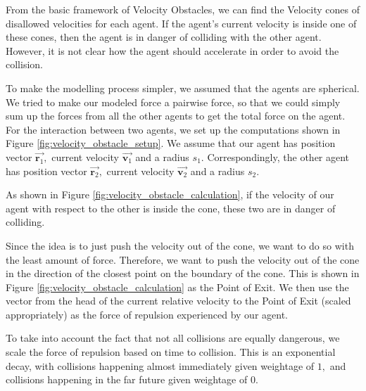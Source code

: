 \documentclass[a4paper,12pt]{article}
\begin{document}
From the basic framework of Velocity Obstacles, we can find the Velocity cones of disallowed velocities for each agent. If the agent's current velocity is inside one of these cones, then the agent is in danger of colliding with the other agent. However, it is not clear how the agent should accelerate in order to avoid the collision.

To make the modelling process simpler, we assumed that the agents are spherical. We tried to make our modeled force a pairwise force, so that we could simply sum up the forces from all the other agents to get the total force on the agent. For the interaction between two agents, we set up the computations shown in Figure \ref{fig:velocity_obstacle_setup}. We assume that our agent has position vector $\overrightarrow{\mathbf{r}_1},$ current velocity $\overrightarrow{\mathbf{v}_1}$ and a radius $s_1.$ Correspondingly, the other agent has position vector $\overrightarrow{\mathbf{r}_2},$ current velocity $\overrightarrow{\mathbf{v}_2}$ and a radius $s_2.$


As shown in Figure \ref{fig:velocity_obstacle_calculation}, if the velocity of our agent with respect to the other is inside the cone, these two are in danger of colliding. 

Since the idea is to just push the velocity out of the cone, we want to do so with the least amount of force. Therefore, we want to push the velocity out of the cone in the direction of the closest point on the boundary of the cone. This is shown in Figure \ref{fig:velocity_obstacle_calculation} as the Point of Exit. We then use the vector from the head of the current relative velocity to the Point of Exit (scaled appropriately) as the force of repulsion experienced by our agent. 

To take into account the fact that not all collisions are equally dangerous, we scale the force of repulsion based on time to collision. This is an exponential decay, with collisions happening almost immediately given weightage of $1,$ and collisions happening in the far future given weightage of $0.$

\end{document}
